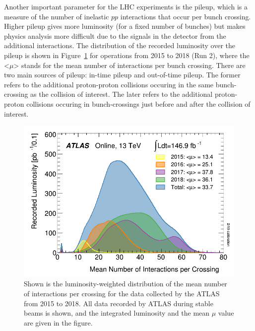 Another important parameter for the LHC experiments is the pileup, 
which is a measure of the number of inelastic $pp$ interactions that occur per bunch crossing. 
Higher pileup gives more luminosity (for a fixed number of bunches) 
but makes physics analysis more difficult due to the signals in the detector 
from the additional interactions. The distribution of the recorded luminosity over
the pileup is shown in Figure~\ref{fig:Run2_pileup} for operations from 2015 to 2018 (Run 2), 
where the <$\mu$> stands for the mean number of interactions per bunch crossing.
There are two main sources of pileup: in-time pileup and out-of-time pileup.
The former refers to the additional proton-proton collisions occuring in
the same bunch-crossing as the collision of interest. 
The later refers to the additional proton-proton collisions occuring
in bunch-crossings just before and after the collision of interest. 
\begin{figure}[bht]
	\begin{centering}	
	\includegraphics[width=.6\textwidth]{Detector/plots/Run2_pileup.png}
	\caption{Shown is the luminosity-weighted distribution of the mean number of 
	interactions per crossing for the data collected by the ATLAS from 2015 to 2018. 
	All data recorded by ATLAS during stable beams is shown, and the integrated luminosity and 
	the mean $\mu$ value are given in the figure. 
		}
	\label{fig:Run2_pileup}
	\end{centering}
\end{figure}

